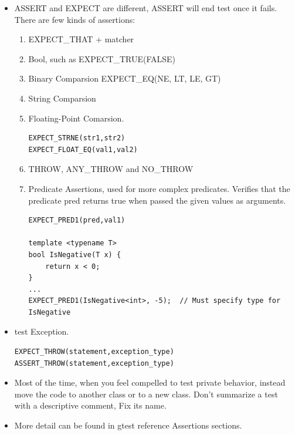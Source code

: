 \documentclass[a4paper,11pt,twoside]{book}
\begin{document}
\begin{itemize}
\item  ASSERT and EXPECT are different, ASSERT will end test once it fails. There are few kinds of assertions: 
\begin{enumerate}
	\item EXPECT\_THAT + matcher
	\item Bool, such as EXPECT\_TRUE(FALSE)
	\item Binary Comparsion EXPECT\_EQ(NE, LT, LE, GT)
	\item String Comparsion
	\item Floating-Point Comarsion.
\begin{lstlisting}
EXPECT_STRNE(str1,str2)
EXPECT_FLOAT_EQ(val1,val2)
\end{lstlisting}
	\item THROW, ANY\_THROW and NO\_THROW
	\item Predicate Assertions, used for more complex predicates. Verifies that the predicate pred returns true when passed the given values as arguments.
\begin{lstlisting}
EXPECT_PRED1(pred,val1)

template <typename T>
bool IsNegative(T x) {
	return x < 0;
}
...
EXPECT_PRED1(IsNegative<int>, -5);  // Must specify type for IsNegative
\end{lstlisting}

\end{enumerate}

\item test Exception.
\begin{lstlisting}
EXPECT_THROW(statement,exception_type)
ASSERT_THROW(statement,exception_type)
\end{lstlisting}

	\item Most of the time, when you feel compelled to test private behavior, instead move the code to another class or to a new class. Don't summarize a test with a descriptive comment, Fix its name. 

	\item More detail can be found in gtest reference Assertions sections.
	
\end{itemize}
\end{document}
